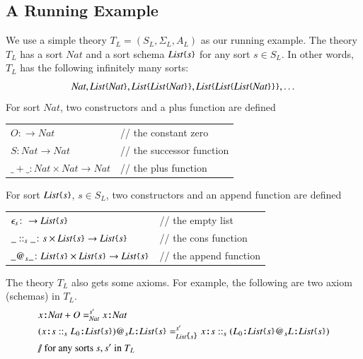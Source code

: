 \documentclass[UTF8,11pt]{article}
\theoremstyle{plain}
\theoremstyle{definition}
\theoremstyle{remark}
\newcommand{\cln}{\texttt{:}}
\newcommand{\Nat}{\textit{Nat}}
\newcommand{\List}{\textit{List}}
\newcommand{\parametric}[2]{{#1}\raisebox{.2ex}{\texttt{\footnotesize{\{}}}#2\raisebox{.2ex}{\texttt{\footnotesize{\}}}}}
\newcommand{\doubleslash}{/\!/{ }}
\begin{document}
\subsection{A Running Example}
We use a simple theory $T_L = (S_L, \Sigma_L, A_L)$ as our
running example.
The theory $T_L$ has a sort $\Nat$ and a sort schema $\parametric{\List}{s}$
for any sort $s \in S_L$.
In other words, $T_L$ has the following infinitely many sorts:
$$\Nat, \parametric{\List}{\Nat},
\parametric{\List}{\parametric{\List}{\Nat}},
\parametric{\List}{\parametric{\List}{\parametric{\List}{\Nat}}} ,\dots $$
For sort $\Nat$, two constructors and a plus function are defined
\begin{center}
\begin{tabular}{ll}
  $O \colon \to \Nat$       & \doubleslash the constant zero \\
  $S \colon \Nat \to \Nat$  & \doubleslash the successor function \\
  $\_+\_ \colon \Nat \times \Nat \to \Nat$ & \doubleslash the plus function
\end{tabular}
\end{center}
For sort $\parametric{\List}{s}$, $s \in S_L$, two constructors and an
append
function are defined
\begin{center}
 \begin{tabular}{ll}
  $\epsilon_s \colon \to \parametric{\List}{s}$       &
  \doubleslash the empty list \\
  $\_::_s\_ \colon s \times \parametric{\List}{s} \to
  \parametric{\List}{s}$  &
  \doubleslash the cons function \\
  $\_@_s\_ \colon \parametric{\List}{s} \times \parametric{\List}{s} \to
  \parametric{\List}{s}$ & \doubleslash the append function
 \end{tabular}
\end{center}
The theory $T_L$ also gets some axioms.
For example, the following are two axiom (schemas) in $T_L$.
\begin{align*}
& x \cln \Nat + O =_{\Nat}^{s'} x \cln \Nat \\
& (x \cln s ::_s L_0 \cln \parametric{\List}{s}) @_s L \cln
\parametric{\List}{s}
=_{\parametric{\List}{s}}^{s'} x \cln s::_s (L_0 \cln
\parametric{\List}{s}@_s L\cln \parametric{\List}{s}) \\
& \text{\doubleslash for any sorts $s, s'$ in $T_L$}
\end{align*}
\end{document}

